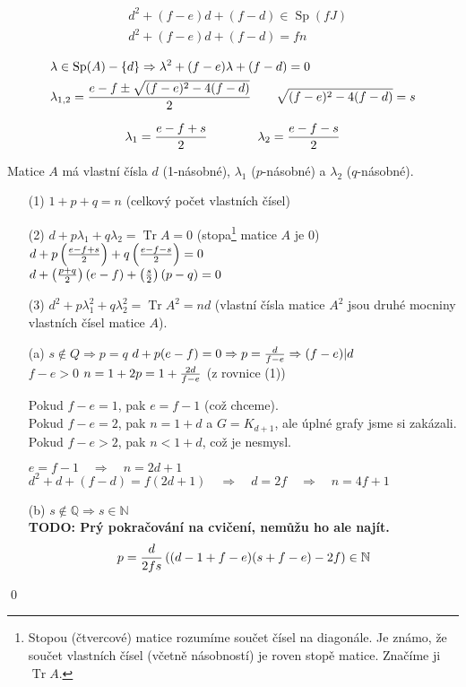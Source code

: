 \documentclass[a4paper,12pt,titlepage]{article}
\newcommand{\Q}{\mathbb{Q}}
\newcommand{\N}{\mathbb{N}}
\newcommand{\todo}[1]{\bf TODO: \rm#1}
\DeclareMathOperator{\Sp}{Sp}
\DeclareMathOperator{\Tr}{Tr}
\begin{document}
\begin{align}
	&d^2 + (f-e)d + (f-d) \in \Sp(fJ) \\
	&d^2 + (f-e)d + (f-d) = fn \\
\end{align}
\begin{align}
	&\lambda \in \Sp(A) - \{d\} \Rightarrow \lambda^2 + (f-e)\lambda + (f-d) = 0 \\
	&\lambda_{1,2} = {e-f \pm \sqrt{(f-e)^2-4(f-d)} \over 2} \qquad \sqrt{(f-e)^2-4(f-d)} = s
\end{align}

$$\lambda_1 = {e-f+s\over 2}\qquad\qquad \lambda_2 = {e-f-s\over 2}$$

Matice $A$ má vlastní čísla $d$ (1-násobné), $\lambda_1$ ($p$-násobné) a
$\lambda_2$ ($q$-násobné).

\begin{enumerate}
	\item[(1)] $1 + p + q = n$ (celkový počet vlastních čísel)

	\item[(2)] $d + p\lambda_1 + q\lambda_2 = \Tr A = 0$ (stopa\footnote{Stopou (čtvercové) matice rozumíme součet čísel na diagonále. Je známo, že součet vlastních čísel (včetně násobností) je roven stopě matice. Značíme ji $\Tr A$.} matice $A$ je 0) \\
	$d + p\left({e-f+s\over 2}\right) + q\left({e-f-s\over 2}\right) = 0$ \\
	$d + \left({p+q\over 2}\right)(e-f) + \left({s\over 2}\right)(p-q) = 0$

	\item[(3)] $d^2 + p\lambda_1^2 + q\lambda_2^2 = \Tr A^2 = nd$ (vlastní čísla matice $A^2$ jsou druhé mocniny vlastních čísel matice $A$).
\end{enumerate}

\begin{enumerate}
	\item[(a)] $s\not\in Q \Rightarrow p = q$ \quad $d + p(e-f) = 0 \Rightarrow p = {d\over f-e} \Rightarrow (f-e)|d$ \\
	$f-e > 0$ \quad $n = 1 + 2p = 1 + {2d\over f-e}$ \quad (z rovnice (1))

	Pokud $f-e = 1$, pak $e = f-1$ (což chceme). \\
	Pokud $f-e = 2$, pak $n = 1+d$ a $G = K_{d+1}$, ale úplné grafy jsme si zakázali. \\
	Pokud $f-e > 2$, pak $n < 1+d$, což je nesmysl.

	$e = f-1 \quad\Rightarrow\quad n = 2d+1$ \\
	$d^2 + d + (f-d) = f(2d+1) \quad\Rightarrow\quad d = 2f \quad\Rightarrow\quad n = 4f+1$

	\item[(b)] $s\not\in\Q\Rightarrow s\in\N$ \\
	\todo Prý pokračování na cvičení, nemůžu ho ale najít. \\
	$$p = {d\over 2fs}\left((d-1+f-e)(s+f-e)-2f\right) \in \N$$
\end{enumerate}
\qed
\end{document}
